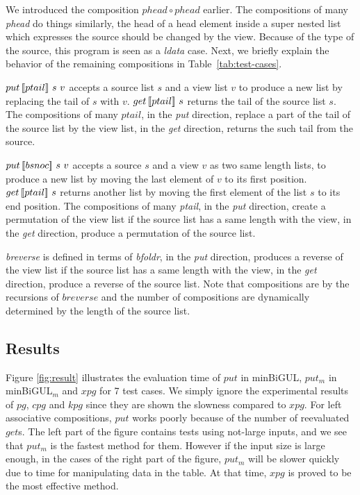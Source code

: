 We introduced the composition $phead \circ phead$ earlier. The compositions of many \textit{phead} do things similarly, the head of a head element inside a super nested list which expresses the source should be changed by the view. Because of the type of the source, this program is seen as a \textit{ldata} case. Next, we briefly explain the behavior of the remaining compositions in Table~\ref{tab:test-cases}.

$put \, [\![ptail]\!] \ s \ v$ accepts a source list $s$ and a view list $v$ to produce a new list by replacing the tail of $s$ with $v$. $get \, [\![ptail]\!] \ s$ returns the tail of the source list $s$. The compositions of many $ptail$, in the \textit{put} direction, replace a part of the tail of the source list by the view list, in the \textit{get} direction, returns the such tail from the source.

$put \, [\![bsnoc]\!] \ s \ v$ accepts a source $s$ and a view $v$ as two same length lists, to produce a new list by moving the last element of $v$ to its first position. $get \, [\![ptail]\!] \ s$ returns another list by moving the first element of the list $s$ to its end position. The compositions of many \textit{ptail}, in the \textit{put} direction, create a permutation of the view list if the source list has a same length with the view, in the \textit{get} direction, produce a permutation of the source list.

\textit{breverse} is defined in terms of \textit{bfoldr}, in the \textit{put} direction, produces a reverse of the view list if the source list has a same length with the view, in the \textit{get} direction, produce a reverse of the source list. Note that compositions are by the recursions of $breverse$ and 
the number of compositions are dynamically determined by the length of the source list.

\subsection{Results}



Figure \ref{fig:result} illustrates the evaluation time of $put$ in minBiGUL, $put_m$ in minBiGUL$_m$ and $xpg$ for 7 test cases. We simply ignore the experimental results of $pg$, $cpg$ and $kpg$ since they are shown the slowness compared to $xpg$. For left associative compositions, $put$ works poorly because of the number of reevaluated $get$s.
The left part of the figure contains tests using not-large inputs, and we see that $put_m$ is the fastest method for them. However if the input size is large enough, in the cases of the right part of the figure, $put_m$ will be slower quickly due to time for manipulating data in the table. At that time, $xpg$ is proved to be the most effective method.
